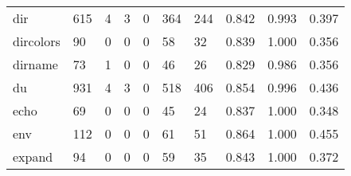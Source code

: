 \begin{longtable}{lp{2.0cm}p{2.0cm}p{2.0cm}p{2.0cm}p{2.0cm}p{2.0cm}p{2.0cm}p{2.0cm}p{2.0cm}}
dir       &                    615 &                                             4 &                                            3 &                                           0 &                                          364 &                                        244 &                                0.842 &                                  0.993 &                                0.397 \\
dircolors &                     90 &                                             0 &                                            0 &                                           0 &                                           58 &                                         32 &                                0.839 &                                  1.000 &                                0.356 \\
dirname   &                     73 &                                             1 &                                            0 &                                           0 &                                           46 &                                         26 &                                0.829 &                                  0.986 &                                0.356 \\
du        &                    931 &                                             4 &                                            3 &                                           0 &                                          518 &                                        406 &                                0.854 &                                  0.996 &                                0.436 \\
echo      &                     69 &                                             0 &                                            0 &                                           0 &                                           45 &                                         24 &                                0.837 &                                  1.000 &                                0.348 \\
env       &                    112 &                                             0 &                                            0 &                                           0 &                                           61 &                                         51 &                                0.864 &                                  1.000 &                                0.455 \\
expand    &                     94 &                                             0 &                                            0 &                                           0 &                                           59 &                                         35 &                                0.843 &                                  1.000 &                                0.372 \\

\end{longtable}
